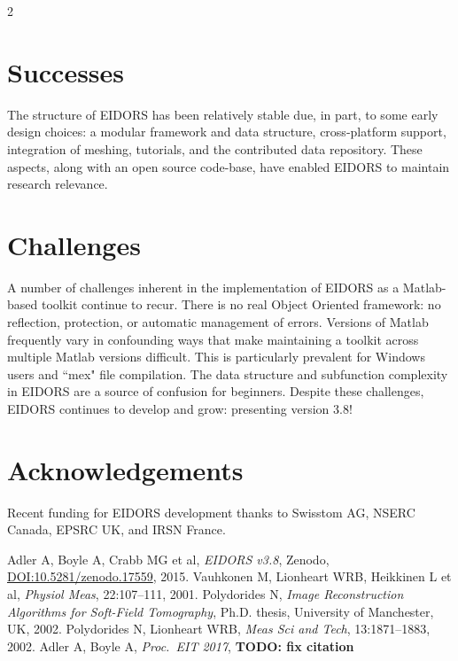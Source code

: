 \documentclass[10pt,a4paper]{article}
\newcommand{\TODO}[1]{\bf TODO: #1}
\renewenvironment{thebibliography}[1]{%
    \begin{oldthebibliography}{#1}%
      \setlength{\parskip}{0ex}%
      \setlength{\itemsep}{0ex}%
  }%
  {%
    \end{oldthebibliography}%
  }
\begin{document}
\begin{multicols}{2}
\section{Successes}
The structure of EIDORS has been relatively stable due, in part, to some early design choices:
a modular framework and data structure,
cross-platform support, integration of meshing,
tutorials, and the contributed data repository.
These aspects, along with an open source code-base, have enabled EIDORS to
maintain research relevance.

\section{Challenges}
A number of challenges inherent in the implementation of EIDORS as a Matlab-based toolkit continue to recur.
There is no real Object Oriented framework: no reflection, protection, or
  automatic management of errors.
Versions of Matlab frequently vary in confounding ways that make
  maintaining a toolkit across multiple Matlab versions difficult. This is
  particularly prevalent for Windows users and ``mex" file compilation.
The data structure and subfunction complexity in EIDORS are a
  source of confusion for beginners.
Despite these challenges, EIDORS continues to develop and grow: presenting version 3.8!

\section*{Acknowledgements}
Recent funding for EIDORS development thanks to
Swisstom AG, NSERC Canada, EPSRC UK, and IRSN France.

\footnotesize
\begin{thebibliography}{}
   Adler A, Boyle A, Crabb MG et al,
   {\em EIDORS v3.8}, Zenodo,
   \href{http://dx.doi.org/10.5281/zenodo.17559}{DOI:10.5281/zenodo.17559},
    2015.
   Vauhkonen M, Lionheart WRB, Heikkinen L et al,
   {\em  Physiol Meas}, 22:107--111, 2001.
   Polydorides N,
 {\em Image Reconstruction Algorithms for Soft-Field Tomography}, Ph.D. thesis,
   University of Manchester, UK, 2002.
   Polydorides N, Lionheart WRB,
   {\em Meas Sci and Tech}, 13:1871--1883, 2002.
   Adler A, Boyle A, {\em Proc.\ EIT 2017}, \TODO{fix citation}
\end{thebibliography}
\end{multicols}
\end{document}

